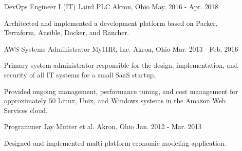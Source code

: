 \begin{cventries}
  \cventry
    {DevOps Engineer I (IT)} %
    {Laird PLC} %
    {Akron, Ohio} %
    {May. 2016 - Apr. 2018} %
    {
      \begin{cvitems} %
        \item {Architected and implemented a development platform based on Packer, Terraform, Ansible, Docker, and Rancher.}
      \end{cvitems}
    }

  \cventry
    {AWS Systems Administrator} %
    {My1HR, Inc.} %
    {Akron, Ohio} %
    {Mar. 2013 - Feb. 2016} %
    {
      \begin{cvitems} %
        \item {Primary system administrator responsible for the design, implementation, and security of all IT systems for a small SaaS startup.}
        \item {Provided ongoing management, performance tuning, and cost management for approximately 50 Linux, Unix, and Windows systems in the Amazon Web Services cloud.}
      \end{cvitems}
    }

  \cventry
    {Programmer} %
    {Jay Mutter et al.} %
    {Akron, Ohio} %
    {Jan. 2012 - Mar. 2013} %
    {
      \begin{cvitems} %
        \item {Designed and implemented multi-platform economic modeling application.}
      \end{cvitems}
    }

\end{cventries}
